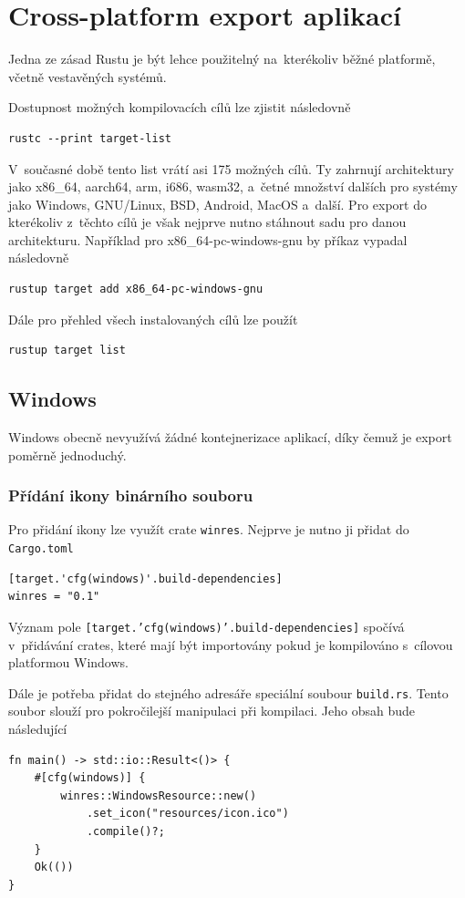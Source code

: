 \documentclass[a4paper, 12pt, twoside]{article} %
\begin{document}
\section{Cross-platform export aplikací}
	Jedna ze zásad Rustu je být lehce použitelný na~kterékoliv běžné platformě, včetně vestavěných systémů.
	
	Dostupnost možných kompilovacích cílů lze zjistit následovně
	\begin{verbatim}
rustc --print target-list
	\end{verbatim}
		
	V~současné době tento list vrátí asi 175 možných cílů. Ty zahrnují architektury jako x86\_64, aarch64, arm, i686, wasm32, a~četné množství dalších pro systémy jako Windows, GNU/Linux, BSD, Android, MacOS a~další. Pro export do kterékoliv z~těchto cílů je však nejprve nutno stáhnout sadu pro danou architekturu. Například pro x86\_64-pc-windows-gnu by příkaz vypadal následovně
	\begin{verbatim}
rustup target add x86_64-pc-windows-gnu
	\end{verbatim}
	
	Dále pro přehled všech instalovaných cílů lze použít
	\begin{verbatim}
rustup target list
	\end{verbatim}

	\subsection{Windows}
	Windows obecně nevyužívá žádné kontejnerizace aplikací, díky čemuž je export poměrně jednoduchý.
	
	\subsubsection*{Přídání ikony binárního souboru}
		Pro přidání ikony lze využít crate \texttt{winres}. Nejprve je nutno ji přidat do \texttt{Cargo.toml}
		\begin{verbatim}
[target.'cfg(windows)'.build-dependencies]
winres = "0.1"
		\end{verbatim}
		
		Význam pole \texttt{[target.'cfg(windows)'.build-dependencies]} spočívá v~přidávání crates, které mají být importovány pokud je kompilováno s~cílovou platformou Windows.
		
		Dále je potřeba přidat do stejného adresáře speciální soubour \texttt{build.rs}. Tento soubor slouží pro pokročilejší manipulaci při kompilaci. Jeho obsah bude následující
		\begin{verbatim}
fn main() -> std::io::Result<()> {
	#[cfg(windows)] {
		winres::WindowsResource::new()
			.set_icon("resources/icon.ico")
			.compile()?;
	}
	Ok(())
}
		\end{verbatim}
\end{document}
